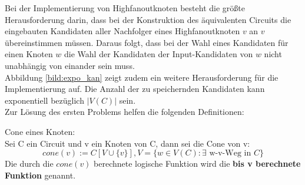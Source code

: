 \documentclass[11pt, a4paper, german]{article}
\begin{document}
Bei der Implementierung von Highfanoutknoten besteht die größte Herausforderung darin, dass bei der Konstruktion des äquivalenten Circuits die eingebauten Kandidaten aller Nachfolger eines Highfanoutknoten $v$ an $v$ übereinstimmen müssen. Daraus folgt, dass bei der Wahl eines Kandidaten für einen Knoten $w$ die Wahl der Kandidaten der Input-Kandidaten von $w$ nicht unabhängig von einander sein muss. \\
Abbildung \ref{bild:expo_kan} zeigt zudem ein weitere Herausforderung für die Implementierung auf. Die Anzahl der zu speichernden Kandidaten kann  exponentiell bezüglich $|V(C)|$ sein. \\
Zur Lösung des ersten Problems helfen die folgenden Definitionen:\\

\begin{definition}{Cone eines Knoten:}\\
	Sei C ein Circuit und v ein Knoten von C, dann sei die Cone von v: 
	\[ cone(v) := C[V \cup \{ v \}], V = \{ w \in V(C) : \exists \text{ w-v-Weg in }  C \} \] 
	Die durch die $cone(v)$ berechnete logische Funktion wird die	{\bf bis v berechnete Funktion} genannt.
\end{definition}
\end{document}
